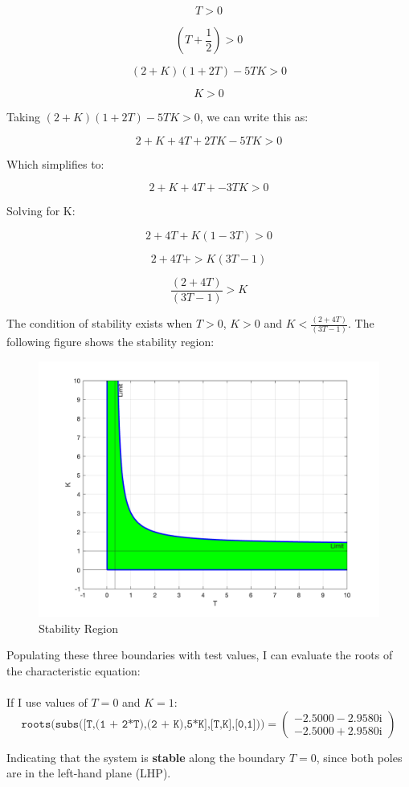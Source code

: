 \documentclass[12pt, letterpaper]{../assignment}
\begin{document}
 $$ T > 0 $$

 $$ (T + \frac{1}{2}) > 0 $$

 $$ (2 + K)(1 + 2T) -5TK > 0 $$

 $$ K > 0 $$ 

 Taking $ (2 + K)(1 + 2T) -5TK > 0 $, we can write this as:

 $$ 2 + K + 4T + 2TK -5TK > 0 $$

 Which simplifies to:

 $$ 2 + K + 4T + -3TK > 0 $$

 Solving for K:

 $$ 2 + 4T + K(1-3T) > 0 $$

 $$ 2 + 4T + > K(3T-1) $$

 $$ \frac{(2 + 4T)}{(3T-1)} > K $$

 The condition of stability exists when $ T > 0 $, $ K >0 $ and $ K <\frac{(2 + 4T)}{(3T-1)} $.
 The following figure shows the stability region:

 \begin{figure}[H]
    \centering
    \includegraphics[width=0.7\linewidth]{./figures/stability_region.png}
    \caption{Stability Region}
    \label{fig:stability}
 \end{figure}

 Populating these three boundaries with test values, I can evaluate the roots of the characteristic equation:
\\\\
If I use values of $T =0$ and $K = 1$:
 $$\texttt{roots(subs([T,(1 + 2*T),(2 + K),5*K],[T,K],[0,1]))} =
 \left(\begin{array}{c} -2.5000-2.9580{}\mathrm{i}\\ -2.5000+2.9580{}\mathrm{i} \end{array}\right)$$
\begin{answer}
Indicating that the system is \textbf{stable} along the boundary $T = 0$, since both poles are in the left-hand plane (LHP).
\end{answer}
\end{document}
